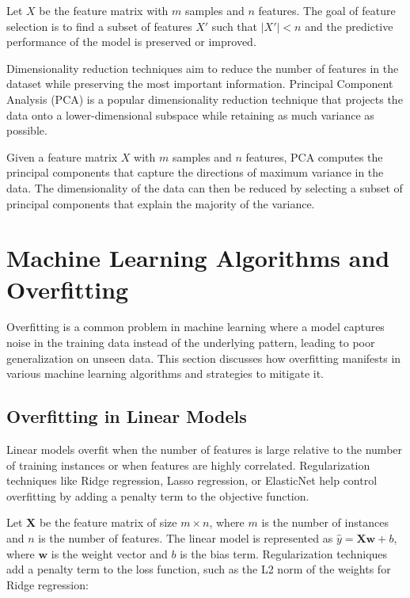 \documentclass[12pt]{book} %
\begin{document}
Let \(X\) be the feature matrix with \(m\) samples and \(n\) features. The goal of feature selection is to find a subset of features \(X'\) such that \(|X'| < n\) and the predictive performance of the model is preserved or improved.

Dimensionality reduction techniques aim to reduce the number of features in the dataset while preserving the most important information. Principal Component Analysis (PCA) is a popular dimensionality reduction technique that projects the data onto a lower-dimensional subspace while retaining as much variance as possible.

Given a feature matrix \(X\) with \(m\) samples and \(n\) features, PCA computes the principal components that capture the directions of maximum variance in the data. The dimensionality of the data can then be reduced by selecting a subset of principal components that explain the majority of the variance.

\section{Machine Learning Algorithms and Overfitting}

Overfitting is a common problem in machine learning where a model captures noise in the training data instead of the underlying pattern, leading to poor generalization on unseen data. This section discusses how overfitting manifests in various machine learning algorithms and strategies to mitigate it.

\subsection{Overfitting in Linear Models}

Linear models overfit when the number of features is large relative to the number of training instances or when features are highly correlated. Regularization techniques like Ridge regression, Lasso regression, or ElasticNet help control overfitting by adding a penalty term to the objective function.

Let \( \mathbf{X} \) be the feature matrix of size \( m \times n \), where \( m \) is the number of instances and \( n \) is the number of features. The linear model is represented as \( \hat{y} = \mathbf{X} \mathbf{w} + b \), where \( \mathbf{w} \) is the weight vector and \( b \) is the bias term. Regularization techniques add a penalty term to the loss function, such as the L2 norm of the weights for Ridge regression:
\end{document}
